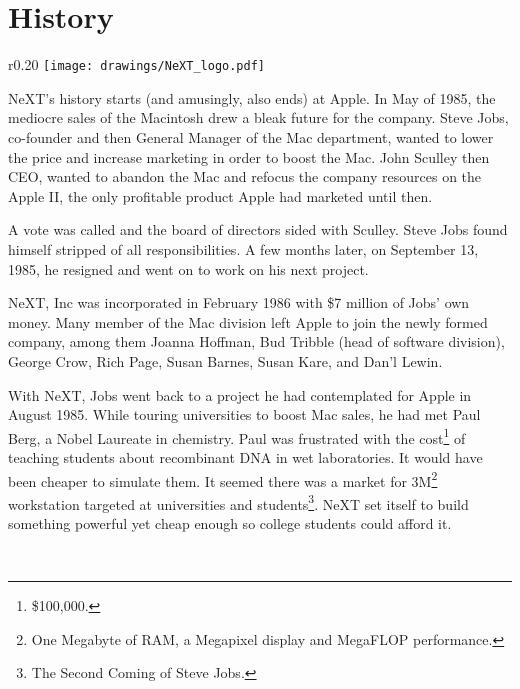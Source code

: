 \section{History}

\begin{wrapfigure}[8]{r}{0.20\textwidth}
\centering
\texttt{[image: drawings/NeXT\_logo.pdf]}
\end{wrapfigure}
\par
NeXT's history starts (and amusingly, also ends) at Apple. In May of 1985, the mediocre sales of the Macintosh drew a bleak future for the company. Steve Jobs, co-founder and then General Manager of the Mac department, wanted to lower the price and increase marketing in order to boost the Mac. John Sculley then CEO, wanted to abandon the Mac and refocus the company resources on the Apple II, the only profitable product Apple had marketed until then.\\
\par
 A vote was called and the board of directors sided with Sculley. Steve Jobs found himself stripped of all responsibilities. A few months later, on September 13, 1985, he resigned and went on to work on his next project.\\
\par
NeXT, Inc was incorporated in February 1986 with \$7 million of Jobs' own money. Many member of the Mac division left Apple to join the newly formed company, among them  Joanna Hoffman, Bud Tribble (head of software division), George Crow, Rich Page, Susan Barnes, Susan Kare, and Dan'l Lewin.\\ 
\par
With NeXT, Jobs went back to a project he had contemplated for Apple in August 1985. While touring universities to boost Mac sales, he had met Paul Berg, a Nobel Laureate in chemistry. Paul was frustrated with the cost\footnote{\$100,000.} of teaching students about recombinant DNA in wet laboratories. It would have been cheaper to simulate them. It seemed there was a market for 3M\footnote{One Megabyte of RAM, a Megapixel display and MegaFLOP performance.} workstation targeted at universities and students\footnote{The Second Coming of Steve Jobs.}. NeXT set itself to build something powerful yet cheap enough so college students could afford it.\\
\par
{}\\
\par
